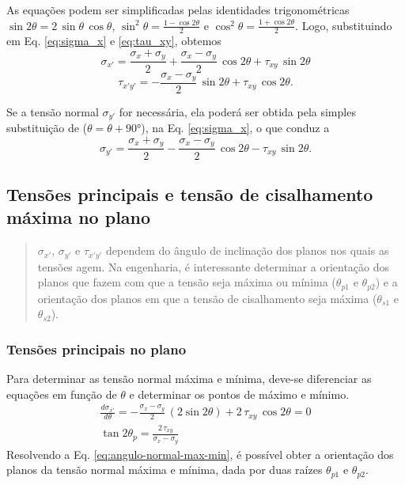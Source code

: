 \documentclass[11pt]{article}
\begin{document}
	As equações podem ser simplificadas pelas identidades trigonométricas $\sin 2\theta=2\,\sin\theta \, \cos\theta$, $\sin^2 \theta=\frac{1-\cos 2\theta}{2}$ e $\cos^2 \theta=\frac{1+\cos 2\theta}{2}$. Logo, substituindo em Eq. \ref{eq:sigma_x} e \ref{eq:tau_xy}, obtemos
	\begin{equation}
		\sigma_{x'}=\frac{\sigma_x+\sigma_y}{2}+\frac{\sigma_x-\sigma_y}{2}\, \cos 2\theta+\tau_{xy}\, \sin 2\theta
		\label{eq:sigma_x_2}
	\end{equation}
	\begin{equation}
		\tau_{x'y'}=-\frac{\sigma_x-\sigma_y}{2}\, \sin 2\theta+\tau_{xy}\, \cos 2\theta
		\label{eq:tau_xy_2}.
	\end{equation}

	Se a tensão normal $\sigma_{y'}$ for necessária, ela poderá ser obtida pela simples substituição de ($\theta=\theta+\ang{90}$), na Eq. \ref{eq:sigma_x}, o que conduz a
	\begin{equation}
		\sigma_{y'}=\frac{\sigma_x+\sigma_y}{2}-\frac{\sigma_x-\sigma_y}{2}\, \cos 2\theta-\tau_{xy}\, \sin 2\theta
		\label{eq:sigma_y_2}.
	\end{equation}
	
	\subsection{Tensões principais e tensão de cisalhamento máxima no plano}
	
	\begin{quote}
	\small $\sigma_{x'}$, $\sigma_{y'}$ e $\tau_{x'y'}$ dependem do ângulo de inclinação dos planos nos quais as tensões agem. Na engenharia, é interessante determinar a orientação dos planos que fazem com que a tensão seja máxima ou mínima ($\theta_{p1}$ e $\theta_{p2}$) e a orientação dos planos em que a tensão de cisalhamento seja máxima ($\theta_{s1}$ e $\theta_{s2}$).
	\end{quote}

	\subsubsection{Tensões principais no plano}
	
	Para determinar as tensão normal máxima e mínima, deve-se diferenciar as equações em função de $\theta$ e determinar os pontos de máximo e mínimo.
	\begin{gather}
		\frac{d\sigma_{x'}}{d\theta}=-\frac{\sigma_x-\sigma_y}{2}\, (2\sin 2\theta)+2\, \tau_{xy}\, \cos 2\theta=0 \nonumber\\
		\tan 2\theta_p=\frac{2\, \tau_{xy}}{\sigma_x-\sigma_y}
		\label{eq:angulo-normal-max-min}
	\end{gather}
	Resolvendo a Eq. \ref{eq:angulo-normal-max-min}, é possível obter a orientação dos planos da tensão normal máxima e mínima, dada por duas raízes $\theta_{p1}$ e $\theta_{p2}$.
	
\end{document}
